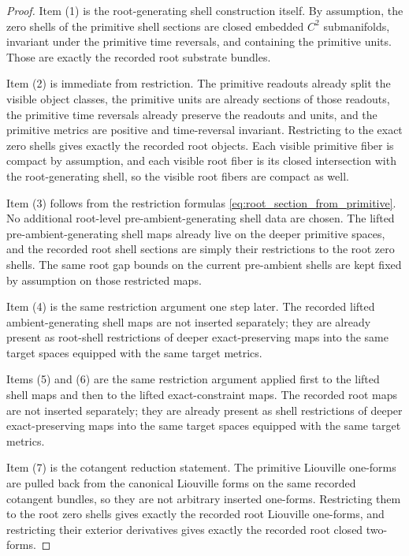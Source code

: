 \documentclass[11pt]{article}
\begin{document}
\begin{proof}
Item (1) is the root-generating shell construction itself. By assumption, the zero shells of the primitive shell sections are closed embedded \(C^2\) submanifolds, invariant under the primitive time reversals, and containing the primitive units. Those are exactly the recorded root substrate bundles.

Item (2) is immediate from restriction. The primitive readouts already split the visible object classes, the primitive units are already sections of those readouts, the primitive time reversals already preserve the readouts and units, and the primitive metrics are positive and time-reversal invariant. Restricting to the exact zero shells gives exactly the recorded root objects. Each visible primitive fiber is compact by assumption, and each visible root fiber is its closed intersection with the root-generating shell, so the visible root fibers are compact as well.

Item (3) follows from the restriction formulas \eqref{eq:root_section_from_primitive}. No additional root-level pre-ambient-generating shell data are chosen. The lifted pre-ambient-generating shell maps already live on the deeper primitive spaces, and the recorded root shell sections are simply their restrictions to the root zero shells. The same root gap bounds on the current pre-ambient shells are kept fixed by assumption on those restricted maps.

Item (4) is the same restriction argument one step later. The recorded lifted ambient-generating shell maps are not inserted separately; they are already present as root-shell restrictions of deeper exact-preserving maps into the same target spaces equipped with the same target metrics.

Items (5) and (6) are the same restriction argument applied first to the lifted shell maps and then to the lifted exact-constraint maps. The recorded root maps are not inserted separately; they are already present as shell restrictions of deeper exact-preserving maps into the same target spaces equipped with the same target metrics.

Item (7) is the cotangent reduction statement. The primitive Liouville one-forms are pulled back from the canonical Liouville forms on the same recorded cotangent bundles, so they are not arbitrary inserted one-forms. Restricting them to the root zero shells gives exactly the recorded root Liouville one-forms, and restricting their exterior derivatives gives exactly the recorded root closed two-forms.


\end{proof}
\end{document}
